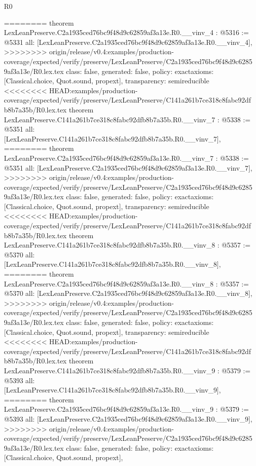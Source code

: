\begin{lexlean}{R0}
\begin{coremodule}
{{{{{{{{{{{{{{{{{{{{{{{{{{{{{{{{{{{{{{{{{{{{{{{{{{{{{{{{{{{{{{{{{{{{{{{{{{========
theorem LexLeanPreserve.C2a1935ced76bc9f48d9c62859af3a13e.R0.__vinv_4 : @5316 := @5331 {
  all: [LexLeanPreserve.C2a1935ced76bc9f48d9c62859af3a13e.R0.__vinv_4],
>>>>>>>> origin/release/v0.4:examples/production-coverage/expected/verify/preserve/LexLeanPreserve/C2a1935ced76bc9f48d9c62859af3a13e/R0.lex.tex
  class: false,
  generated: false,
  policy: exact{axioms: [Classical.choice, Quot.sound, propext]},
  transparency: semireducible
}
<<<<<<<< HEAD:examples/production-coverage/expected/verify/preserve/LexLeanPreserve/C141a261b7ce318c8fabc92dfb8b7a35b/R0.lex.tex
theorem LexLeanPreserve.C141a261b7ce318c8fabc92dfb8b7a35b.R0.__vinv_7 : @5338 := @5351 {
  all: [LexLeanPreserve.C141a261b7ce318c8fabc92dfb8b7a35b.R0.__vinv_7],
========
theorem LexLeanPreserve.C2a1935ced76bc9f48d9c62859af3a13e.R0.__vinv_7 : @5338 := @5351 {
  all: [LexLeanPreserve.C2a1935ced76bc9f48d9c62859af3a13e.R0.__vinv_7],
>>>>>>>> origin/release/v0.4:examples/production-coverage/expected/verify/preserve/LexLeanPreserve/C2a1935ced76bc9f48d9c62859af3a13e/R0.lex.tex
  class: false,
  generated: false,
  policy: exact{axioms: [Classical.choice, Quot.sound, propext]},
  transparency: semireducible
}
<<<<<<<< HEAD:examples/production-coverage/expected/verify/preserve/LexLeanPreserve/C141a261b7ce318c8fabc92dfb8b7a35b/R0.lex.tex
theorem LexLeanPreserve.C141a261b7ce318c8fabc92dfb8b7a35b.R0.__vinv_8 : @5357 := @5370 {
  all: [LexLeanPreserve.C141a261b7ce318c8fabc92dfb8b7a35b.R0.__vinv_8],
========
theorem LexLeanPreserve.C2a1935ced76bc9f48d9c62859af3a13e.R0.__vinv_8 : @5357 := @5370 {
  all: [LexLeanPreserve.C2a1935ced76bc9f48d9c62859af3a13e.R0.__vinv_8],
>>>>>>>> origin/release/v0.4:examples/production-coverage/expected/verify/preserve/LexLeanPreserve/C2a1935ced76bc9f48d9c62859af3a13e/R0.lex.tex
  class: false,
  generated: false,
  policy: exact{axioms: [Classical.choice, Quot.sound, propext]},
  transparency: semireducible
}
<<<<<<<< HEAD:examples/production-coverage/expected/verify/preserve/LexLeanPreserve/C141a261b7ce318c8fabc92dfb8b7a35b/R0.lex.tex
theorem LexLeanPreserve.C141a261b7ce318c8fabc92dfb8b7a35b.R0.__vinv_9 : @5379 := @5393 {
  all: [LexLeanPreserve.C141a261b7ce318c8fabc92dfb8b7a35b.R0.__vinv_9],
========
theorem LexLeanPreserve.C2a1935ced76bc9f48d9c62859af3a13e.R0.__vinv_9 : @5379 := @5393 {
  all: [LexLeanPreserve.C2a1935ced76bc9f48d9c62859af3a13e.R0.__vinv_9],
>>>>>>>> origin/release/v0.4:examples/production-coverage/expected/verify/preserve/LexLeanPreserve/C2a1935ced76bc9f48d9c62859af3a13e/R0.lex.tex
  class: false,
  generated: false,
  policy: exact{axioms: [Classical.choice, Quot.sound, propext]},
}}}}}}}}}}}}}}}}}}}}}}}}}}}}}}}}}}}}}}}}}}}}}}}}}}}}}}}}}}}}}}}}}}}}}}}}}}}}}}
\end{coremodule}
\end{lexlean}
